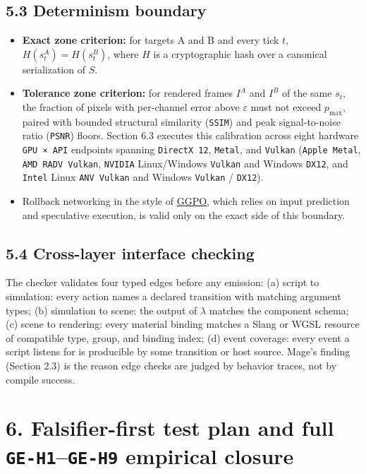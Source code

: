\documentclass[10pt,letterpaper]{article}
\providecommand{\tightlist}{\setlength{\itemsep}{1pt}\setlength{\parskip}{0pt}}
\begin{document}
\subsection{5.3 Determinism boundary}\label{determinism-boundary}

\begin{itemize}
\tightlist
\item
  \textbf{Exact zone criterion:} for targets A and B and every tick
  \(t\), \(H(s_t^A) = H(s_t^B)\), where \(H\) is a cryptographic hash
  over a canonical serialization of \(S\).
\item
  \textbf{Tolerance zone criterion:} for rendered frames \(I^A\) and
  \(I^B\) of the same \(s_t\), the fraction of pixels with per-channel
  error above \(\varepsilon\) must not exceed \(p_{\max}\), paired with
  bounded structural similarity (\texttt{SSIM}) and peak signal-to-noise
  ratio (\texttt{PSNR}) floors. Section 6.3 executes this calibration
  across eight hardware \texttt{GPU\ ×\ API} endpoints spanning
  \texttt{DirectX\ 12}, \texttt{Metal}, and \texttt{Vulkan}
  (\texttt{Apple\ Metal}, \texttt{AMD\ RADV\ Vulkan}, \texttt{NVIDIA}
  Linux/Windows \texttt{Vulkan} and Windows \texttt{DX12}, and
  \texttt{Intel} Linux \texttt{ANV\ Vulkan} and Windows \texttt{Vulkan}
  / \texttt{DX12}).
\item
  Rollback networking in the style of
  \href{https://github.com/pond3r/ggpo}{GGPO}, which relies on input
  prediction and speculative execution, is valid only on the exact side
  of this boundary.
\end{itemize}

\subsection{5.4 Cross-layer interface
checking}\label{cross-layer-interface-checking}

The checker validates four typed edges before any emission: (a) script
to simulation: every action names a declared transition with matching
argument types; (b) simulation to scene: the output of \(\lambda\)
matches the component schema; (c) scene to rendering: every material
binding matches a Slang or WGSL resource of compatible type, group, and
binding index; (d) event coverage: every event a script listens for is
producible by some transition or host source. Mage's finding (Section
2.3) is the reason edge checks are judged by behavior traces, not by
compile success.

\section{\texorpdfstring{6. Falsifier-first test plan and full
\texttt{GE-H1}--\texttt{GE-H9} empirical
closure}{6. Falsifier-first test plan and full GE-H1--GE-H9 empirical closure}}\label{falsifier-first-test-plan-and-full-ge-h1ge-h9-empirical-closure}
\end{document}
